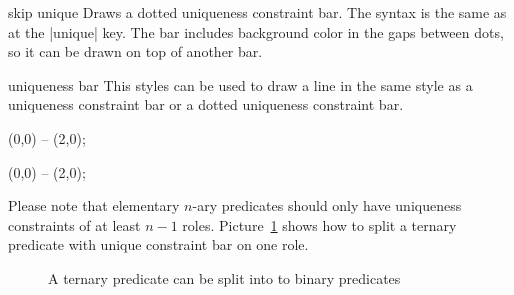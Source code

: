 \documentclass[a4paper,10pt]{article}
\begin{document}
\begin{stylekey}{skip unique}
Draws a dotted uniqueness constraint bar. The syntax is the same as at the |unique| key.
The bar includes background color in the gaps between dots, so it can be drawn on top of 
another bar.
\begin{codeexample}[]
\begin{tikzpicture}
\ternary[unique=1-3,skip unique=2] {};
\end{tikzpicture}
\end{codeexample}
\end{stylekey}

\begin{stylekey}{uniqueness bar}
This styles can be used to draw a line in the same style as a uniqueness constraint bar or a dotted uniqueness constraint bar.
\begin{codeexample}[width=3cm]
\tikz{} (0,0) -- (2,0);
\end{codeexample}
\begin{codeexample}[width=3cm]
\tikz{} (0,0) -- (2,0);
\end{codeexample}
\end{stylekey}

\noindent
Please note that elementary $n$-ary predicates should only have uniqueness constraints of at least $n-1$ roles. Picture~\ref{fig:splitternary} shows how to split a ternary predicate with unique constraint bar on one role.

\begin{figure}[h]
\centering
\begin{codeexample}[]
\end{codeexample}
\caption{A ternary predicate can be split into to binary predicates}
\label{fig:splitternary}
\end{figure}
\end{document}

